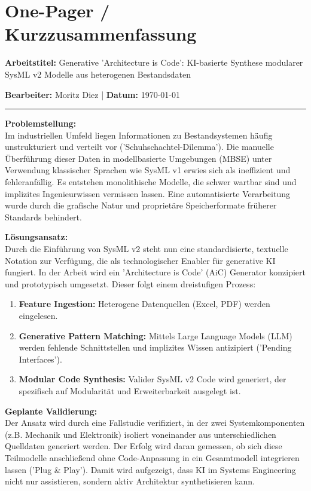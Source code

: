 \documentclass[11pt, a4paper]{article}
\begin{document}
\section*{One-Pager / Kurzzusammenfassung}
\textbf{Arbeitstitel:} Generative 'Architecture is Code': KI-basierte Synthese modularer SysML v2 Modelle aus heterogenen Bestandsdaten

\textbf{Bearbeiter:} Moritz Diez \quad | \quad \textbf{Datum:} \today

\vspace{0.5cm}
\hrule
\vspace{0.5cm}

\textbf{Problemstellung:} \\
Im industriellen Umfeld liegen Informationen zu Bestandsystemen häufig unstrukturiert und verteilt vor ('Schuhschachtel-Dilemma'). Die manuelle Überführung dieser Daten in modellbasierte Umgebungen (MBSE) unter Verwendung klassischer Sprachen wie SysML v1 erwies sich als ineffizient und fehleranfällig. Es entstehen monolithische Modelle, die schwer wartbar sind und implizites Ingenieurwissen vermissen lassen. Eine automatisierte Verarbeitung wurde durch die grafische Natur und proprietäre Speicherformate früherer Standards behindert.

\vspace{0.5cm}

\textbf{Lösungsansatz:} \\
Durch die Einführung von SysML v2 steht nun eine standardisierte, textuelle Notation zur Verfügung, die als technologischer Enabler für generative KI fungiert. In der Arbeit wird ein 'Architecture is Code' (AiC) Generator konzipiert und prototypisch umgesetzt. Dieser folgt einem dreistufigen Prozess:
\begin{enumerate}
    \item \textbf{Feature Ingestion:} Heterogene Datenquellen (Excel, PDF) werden eingelesen.
    \item \textbf{Generative Pattern Matching:} Mittels Large Language Models (LLM) werden fehlende Schnittstellen und implizites Wissen antizipiert ('Pending Interfaces').
    \item \textbf{Modular Code Synthesis:} Valider SysML v2 Code wird generiert, der spezifisch auf Modularität und Erweiterbarkeit ausgelegt ist.
\end{enumerate}

\vspace{0.5cm}

\textbf{Geplante Validierung:} \\
Der Ansatz wird durch eine Fallstudie verifiziert, in der zwei Systemkomponenten (z.B. Mechanik und Elektronik) isoliert voneinander aus unterschiedlichen Quelldaten generiert werden. Der Erfolg wird daran gemessen, ob sich diese Teilmodelle anschließend ohne Code-Anpassung in ein Gesamtmodell integrieren lassen ('Plug \& Play'). Damit wird aufgezeigt, dass KI im Systems Engineering nicht nur assistieren, sondern aktiv Architektur synthetisieren kann.
\end{document}
